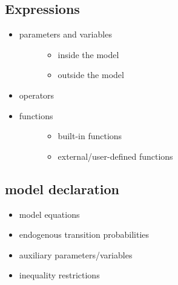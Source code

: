 \documentclass[letterpaper,10pt,english]{sphinxmanual}
\begin{document}
\subsection{Expressions}
\label{dsge_interface:expressions}\begin{itemize}
\item {} \begin{description}
\item[{parameters and variables}] \leavevmode\begin{itemize}
\item {} 
inside the model

\item {} 
outside the model

\end{itemize}

\end{description}

\item {} 
operators

\item {} \begin{description}
\item[{functions}] \leavevmode\begin{itemize}
\item {} 
built-in functions

\item {} 
external/user-defined functions

\end{itemize}

\end{description}

\end{itemize}


\subsection{model declaration}
\label{dsge_interface:model-declaration}\begin{itemize}
\item {} 
model equations

\item {} 
endogenous transition probabilities

\item {} 
auxiliary parameters/variables

\item {} 
inequality restrictions

\end{itemize}
\end{document}
